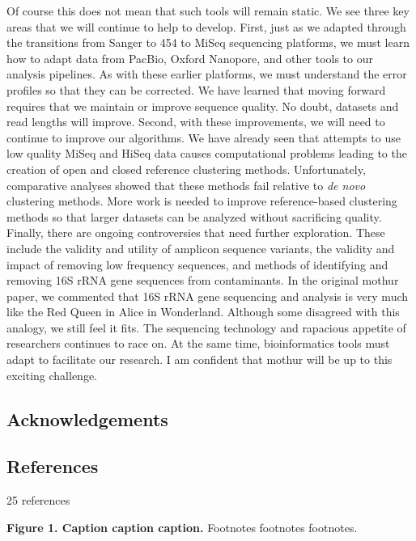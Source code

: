 \documentclass[11pt,]{article}
\begin{document}
Of course this does not mean that such tools will remain static. We see
three key areas that we will continue to help to develop. First, just as
we adapted through the transitions from Sanger to 454 to MiSeq
sequencing platforms, we must learn how to adapt data from PacBio,
Oxford Nanopore, and other tools to our analysis pipelines. As with
these earlier platforms, we must understand the error profiles so that
they can be corrected. We have learned that moving forward requires that
we maintain or improve sequence quality. No doubt, datasets and read
lengths will improve. Second, with these improvements, we will need to
continue to improve our algorithms. We have already seen that attempts
to use low quality MiSeq and HiSeq data causes computational problems
leading to the creation of open and closed reference clustering methods.
Unfortunately, comparative analyses showed that these methods fail
relative to \emph{de novo} clustering methods. More work is needed to
improve reference-based clustering methods so that larger datasets can
be analyzed without sacrificing quality. Finally, there are ongoing
controversies that need further exploration. These include the validity
and utility of amplicon sequence variants, the validity and impact of
removing low frequency sequences, and methods of identifying and
removing 16S rRNA gene sequences from contaminants. In the original
mothur paper, we commented that 16S rRNA gene sequencing and analysis is
very much like the Red Queen in Alice in Wonderland. Although some
disagreed with this analogy, we still feel it fits. The sequencing
technology and rapacious appetite of researchers continues to race on.
At the same time, bioinformatics tools must adapt to facilitate our
research. I am confident that mothur will be up to this exciting
challenge.

\newpage

\hypertarget{acknowledgements}{%
\subsection{Acknowledgements}\label{acknowledgements}}

\newpage

\hypertarget{references}{%
\subsection{References}\label{references}}

25 references

\hypertarget{refs}{}

\newpage

\textbf{Figure 1. Caption caption caption.} Footnotes footnotes
footnotes.
\end{document}
